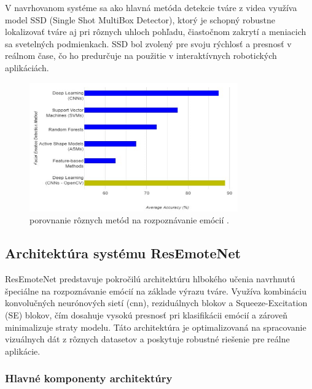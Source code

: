 V navrhovanom systéme sa ako hlavná metóda detekcie tváre z videa využíva model SSD (Single Shot MultiBox Detector), ktorý je schopný robustne lokalizovať tváre aj pri rôznych uhloch pohľadu, čiastočnom zakrytí a meniacich sa svetelných podmienkach. SSD bol zvolený pre svoju rýchlosť a presnosť v reálnom čase, čo ho predurčuje na použitie v interaktívnych robotických aplikáciách.

\begin{figure}[!htpb]
    \centering
    \includegraphics[width=0.8\textwidth]{img/comparation.png}
    \caption{porovnanie rôznych metód na rozpoznávanie emócií \cite{inProceedings02}.}
    \label{fig:comparation}
\end{figure}
\newpage
\subsection{Architektúra systému ResEmoteNet}

ResEmoteNet predstavuje pokročilú architektúru hlbokého učenia navrhnutú špeciálne na rozpoznávanie emócií na základe výrazu tváre. Využíva kombináciu konvolučných neurónových sietí (\gls{cnn}), reziduálnych blokov a Squeeze-Excitation (SE) blokov, čím dosahuje vysokú presnosť pri klasifikácii emócií a zároveň minimalizuje straty modelu. Táto architektúra je optimalizovaná na spracovanie vizuálnych dát z rôznych datasetov a poskytuje robustné riešenie pre reálne aplikácie.

\subsubsection{Hlavné komponenty architektúry}

